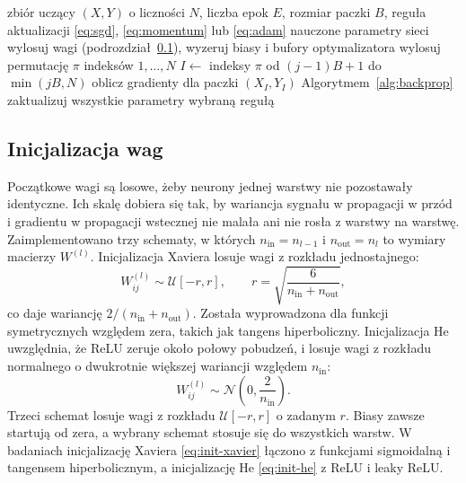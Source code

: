 \begin{algorithm}[H]
    \caption{Uczenie sieci metodą mini-batch}
    \label{alg:training}
    \begin{algorithmic}[1]
        \Require zbiór uczący $(X, Y)$ o liczności $N$, liczba epok $E$, rozmiar paczki $B$, reguła aktualizacji \eqref{eq:sgd}, \eqref{eq:momentum} lub \eqref{eq:adam}
        \Ensure nauczone parametry sieci
        \State wylosuj wagi (podrozdział~\ref{sec:mlp-init}), wyzeruj biasy i bufory optymalizatora
            \State wylosuj permutację $\pi$ indeksów $1, \dots, N$
                \State $I \gets$ indeksy $\pi$ od $(j-1)B + 1$ do $\min(jB, N)$
                \State oblicz gradienty dla paczki $(X_I, Y_I)$ Algorytmem~\ref{alg:backprop}
                \State zaktualizuj wszystkie parametry wybraną regułą
            \EndFor
        \EndFor
    \end{algorithmic}
\end{algorithm}

\subsection{Inicjalizacja wag}
\label{sec:mlp-init}

Początkowe wagi są losowe, żeby neurony jednej warstwy nie pozostawały identyczne. Ich skalę dobiera się tak, by wariancja sygnału w propagacji w przód i gradientu w propagacji wstecznej nie malała ani nie rosła z warstwy na warstwę. Zaimplementowano trzy schematy, w których $n_{\mathrm{in}} = n_{l-1}$ i $n_{\mathrm{out}} = n_l$ to wymiary macierzy $W^{(l)}$. Inicjalizacja Xaviera \cite{glorot2010} losuje wagi z rozkładu jednostajnego:
\begin{equation}
    W^{(l)}_{ij} \sim \mathcal{U}[-r, r], \qquad r = \sqrt{\frac{6}{n_{\mathrm{in}} + n_{\mathrm{out}}}} ,
    \label{eq:init-xavier}
\end{equation}
co daje wariancję $2 / (n_{\mathrm{in}} + n_{\mathrm{out}})$. Została wyprowadzona dla funkcji symetrycznych względem zera, takich jak tangens hiperboliczny. Inicjalizacja He \cite{he2015} uwzględnia, że ReLU zeruje około połowy pobudzeń, i losuje wagi z rozkładu normalnego o dwukrotnie większej wariancji względem $n_{\mathrm{in}}$:
\begin{equation}
    W^{(l)}_{ij} \sim \mathcal{N}\left(0, \frac{2}{n_{\mathrm{in}}}\right).
    \label{eq:init-he}
\end{equation}
Trzeci schemat losuje wagi z rozkładu $\mathcal{U}[-r, r]$ o zadanym $r$. Biasy zawsze startują od zera, a wybrany schemat stosuje się do wszystkich warstw. W badaniach inicjalizację Xaviera \eqref{eq:init-xavier} łączono z funkcjami sigmoidalną i tangensem hiperbolicznym, a inicjalizację He \eqref{eq:init-he} z ReLU i leaky ReLU.
